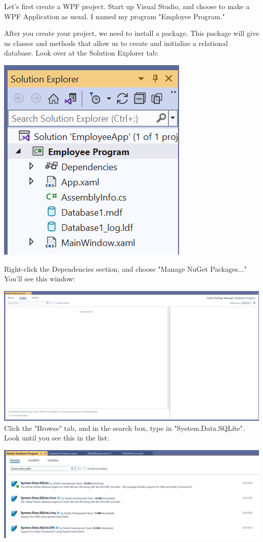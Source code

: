 \documentclass[oneside, openany] {book}
\begin{document}
Let's first create a WPF project. Start up Visual Studio, and choose to make a WPF Application as usual. I named my program "Employee Program."

After you create your project, we need to install a package. This package will give us classes and methods that allow us to create and initialize a relational database. Look over at the Solution Explorer tab:

\includegraphics[scale=0.5]{EmployeeProgram}

Right-click the Dependencies section, and choose "Manage NuGet Packages..."
You'll see this window:

\includegraphics[scale=0.13]{nuget}
Click the "Browse" tab, and in the search box, type in "System.Data.SQLite". Look until you see this in the list:

\includegraphics[scale=0.206]{sqliteinstall}
\end{document}
